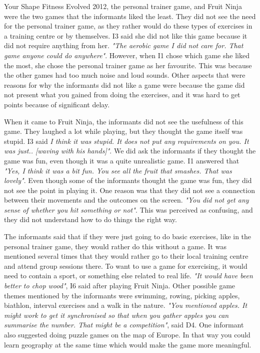 Your Shape Fitness Evolved 2012, the personal trainer game, and Fruit Ninja were the two games that the informants liked the least. They did not see the need for the personal trainer game, as they rather would do these types of exercises in a training centre or by themselves. I3 said she did not like this game because it did not require anything from her. \emph{"The aerobic game I did not care for. That game anyone could do anywhere"}. However, when I1 chose which game she liked the most, she chose the personal trainer game as her favourite. This was because the other games had too much noise and loud sounds. Other aspects that were reasons for why the informants did not like a game were because the game did not present what you gained from doing the exercises, and it was hard to get points because of significant delay. 

When it came to Fruit Ninja, the informants did not see the usefulness of this game. They laughed a lot while playing, but they thought the game itself was stupid. I3 said \emph{I think it was stupid. It does not put any requirements on you. It was just.. [waving with his hands]"}. We did ask the informants if they thought the game was fun, even though it was a quite unrealistic game. I1 answered that \emph{"Yes, I think it was a bit fun. You see all the fruit that smashes. That was lovely"}. Even though some of the informants thought the game was fun, they did not see the point in playing it. One reason was that they did not see a connection between their movements and the outcomes on the screen. \emph{"You did not get any sense of whether you hit something or not"}. This was perceived as confusing, and they did not understand how to do things the right way. 

The informants said that if they were just going to do basic exercises, like in the personal trainer game, they would rather do this without a game. It was mentioned several times that they would rather go to their local training centre and attend group sessions there. To want to use a game for exercising, it would need to contain a sport, or something else related to real life. \emph{"It would have been better to chop wood"}, I6 said after playing Fruit Ninja. Other possible game themes mentioned by the informants were swimming, rowing, picking apples, biathlon, interval exercises and a walk in the nature. \emph{"You mentioned apples. It might work to get it synchronised so that when you gather apples you can summarise the number. That might be a competition"}, said D4. One informant also suggested doing puzzle games on the map of Europe. In that way you could learn geography at the same time which would make the game more meaningful.

